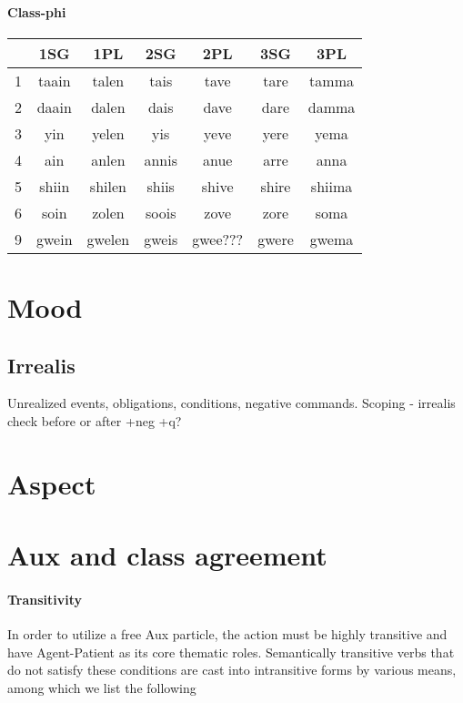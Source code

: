 \documentclass[8pt]{book}
\begin{document}
\paragraph{Class-phi}
\begin{center}
	\begin{tabular}{|l|c|c|c|c|c|c|}
	  \hline
      & 1SG & 1PL & 2SG & 2PL & 3SG & 3PL \\ \hline
      1 & taain & talen & tais & tave & tare & tamma  \\ \hline
      2 & daain & dalen & dais & dave & dare & damma \\ \hline
      3 & yin  & yelen & yis & yeve & yere & yema \\ \hline
      4 & ain & anlen & annis & anue & arre & anna \\ \hline
      5 & shiin & shilen & shiis & shive & shire  & shiima\\ \hline
      6 & soin & zolen & soois & zove & zore & soma \\ \hline
      9 & gwein & gwelen & gweis & gwee??? & gwere & gwema\\ \hline
      \end{tabular}
\end{center}

\section{Mood}
\subsection{Irrealis}
Unrealized events, obligations, conditions, negative commands. Scoping - irrealis check before or after +neg +q?

\section{Aspect}

\section{Aux and class agreement}

\paragraph{Transitivity}
In order to utilize a free Aux particle, the action must be highly transitive and have Agent-Patient as its core thematic roles. Semantically transitive verbs that do not satisfy these conditions are cast into intransitive forms by various means, among which we list the following
\end{document}
